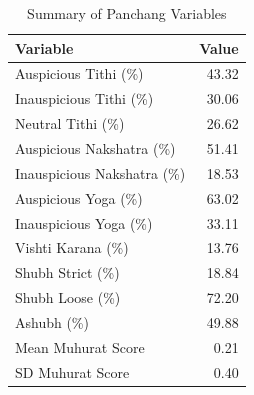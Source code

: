 \begin{table}[!h]
\centering
\caption{\label{tab:tab:panchang_summary}Summary of Panchang Variables}
\centering
\begin{tabular}[t]{lr}
\toprule
Variable & Value\\
\midrule
Auspicious Tithi (\%) & 43.32\\
Inauspicious Tithi (\%) & 30.06\\
Neutral Tithi (\%) & 26.62\\
Auspicious Nakshatra (\%) & 51.41\\
Inauspicious Nakshatra (\%) & 18.53\\
\addlinespace
Auspicious Yoga (\%) & 63.02\\
Inauspicious Yoga (\%) & 33.11\\
Vishti Karana (\%) & 13.76\\
Shubh Strict (\%) & 18.84\\
Shubh Loose (\%) & 72.20\\
\addlinespace
Ashubh (\%) & 49.88\\
Mean Muhurat Score & 0.21\\
SD Muhurat Score & 0.40\\
\bottomrule
\end{tabular}
\end{table}

